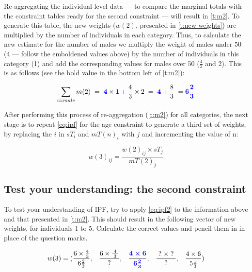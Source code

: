 \documentclass[a4paper, 11pt, twoside]{article}
\begin{document}
Re-aggregating the individual-level data --- to compare the marginal totals with the constraint tables
ready for the second constraint --- will result in
\cref{t:m2}. To generate this table, the new weights ($w(2)$,
presented in \cref{t:new-weights}) are multiplied by the 
number of individuals in each category. Thus, to calculate the new
estimate for the number of males we multiply the weight of
males under 50 (4 --- follow the emboldened values above) by the
number of individuals in this category (1) and add the corresponding values
for males over 50 ($\frac{4}{3}$ and 2). This is as follows
(see the bold value in the bottom left of \cref{t:m2}):

\begin{equation}
\sum_{i = male} m(2) \; = \; \textbf{\color{blue} 4} \times \textbf{\color{blue}1} + \frac{4}{3} \times 2 \; =  \;
\textbf{\color{blue}4} + \frac{8}{3} \; = \textbf{\color{blue}6} \frac{\textbf{\color{blue}2}}{\textbf{\color{blue}3}}
\end{equation}

After performing this process of re-aggregation (\cref{t:m2}) for all categories,
the next stage is to repeat \cref{eq:ipf} for the age constraint to generate a
third set of weights, by replacing
the $i$ in $sT_{i}$ and $mT(n)_{i}$ with $j$ and incrementing the value of n:

\begin{equation}
w(3)_{ij} = \frac{w(2)_{ij} \times sT_{j}}{mT(2)_{j}}
\label{eq:ipf2}
\end{equation}

\subsection{Test your understanding: the second constraint}
To test your understanding of IPF, try to apply \cref{eq:ipf2} to the
information above
and that presented in \cref{t:m2}.
This should result in the following vector of new weights, for individuals 1 to
5. Calculate the correct values and pencil them in in place of the question
marks.  %


\begin{equation}
w(3) = (\frac{6 \times \frac{4}{3}}{6 \frac{2}{3}},\;\;\; \frac{6 \times
\frac{\;4\;}{\;3\;}}{\;?\;},\;\;\; \boldsymbol{ \frac{\color{blue}4 \times 6}{\color{blue} 6\frac{2}{3}
}}, \;\;\;\frac{\;?\; \times \;?\;}{?}, \;\;\;\frac{4 \times 6}{5 \frac{1}{3}})
\end{equation}
\end{document}
